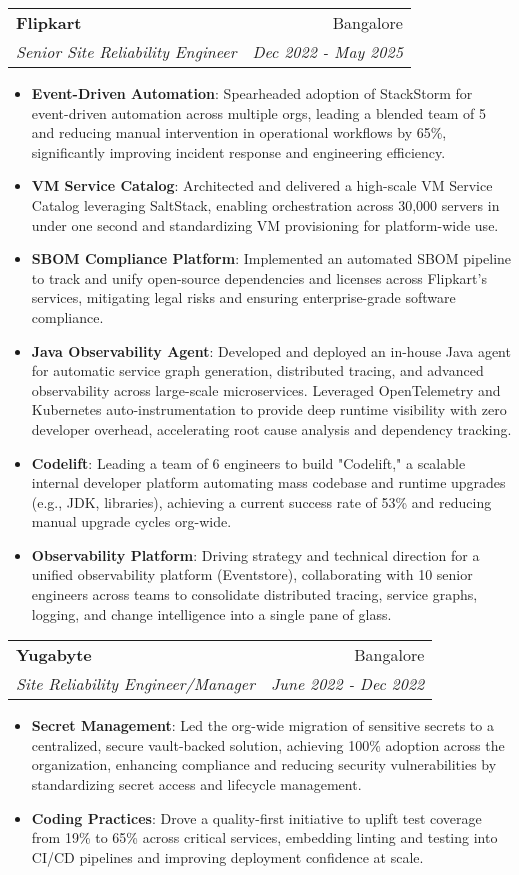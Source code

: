 \documentclass[letterpaper,11pt]{article}
\makeatletter
\newcommand{\resumeItem}[2]{
  \item\small{
    \textbf{#1}{: #2 \vspace{-2pt}}
  }
}
\newcommand{\resumeSubheading}[4]{
  \vspace{-1pt}\item
    \begin{tabular*}{0.97\textwidth}{l@{\extracolsep{\fill}}r}
      \textbf{#1} & #2 \\
      \textit{\small#3} & \textit{\small #4} \\
    \end{tabular*}\vspace{-5pt}
}
\newcommand{\resumeItemListStart}{\begin{itemize}}
\newcommand{\resumeItemListEnd}{\end{itemize}\vspace{-5pt}}
\makeatother
\begin{document}
    \resumeSubheading
      {Flipkart}{Bangalore}
      {Senior Site Reliability Engineer}{Dec 2022 - May 2025}
      \resumeItemListStart
        \resumeItem{Event-Driven Automation}
          {Spearheaded adoption of StackStorm for event-driven automation across multiple orgs, leading a blended team of 5 and reducing manual intervention in operational workflows by 65\%, significantly improving incident response and engineering efficiency.}
        \resumeItem{VM Service Catalog}
          {Architected and delivered a high-scale VM Service Catalog leveraging SaltStack, enabling orchestration across 30,000 servers in under one second and standardizing VM provisioning for platform-wide use.}
        \resumeItem{SBOM Compliance Platform}
          {Implemented an automated SBOM pipeline to track and unify open-source dependencies and licenses across Flipkart’s services, mitigating legal risks and ensuring enterprise-grade software compliance.}
        \resumeItem{Java Observability Agent}
          {Developed and deployed an in-house Java agent for automatic service graph generation, distributed tracing, and advanced observability across large-scale microservices. Leveraged OpenTelemetry and Kubernetes auto-instrumentation to provide deep runtime visibility with zero developer overhead, accelerating root cause analysis and dependency tracking.}
        \resumeItem{Codelift}
          {Leading a team of 6 engineers to build "Codelift," a scalable internal developer platform automating mass codebase and runtime upgrades (e.g., JDK, libraries), achieving a current success rate of 53\% and reducing manual upgrade cycles org-wide.}
        \resumeItem{Observability Platform}
          {Driving strategy and technical direction for a unified observability platform (Eventstore), collaborating with 10 senior engineers across teams to consolidate distributed tracing, service graphs, logging, and change intelligence into a single pane of glass.}
      \resumeItemListEnd

    \resumeSubheading
      {Yugabyte}{Bangalore}
      {Site Reliability Engineer/Manager}{June 2022 - Dec 2022}
      \resumeItemListStart
        \resumeItem{Secret Management}
          {Led the org-wide migration of sensitive secrets to a centralized, secure vault-backed solution, achieving 100\% adoption across the organization, enhancing compliance and reducing security vulnerabilities by standardizing secret access and lifecycle management.}
        \resumeItem{Coding Practices}
          {Drove a quality-first initiative to uplift test coverage from 19\% to 65\% across critical services, embedding linting and testing into CI/CD pipelines and improving deployment confidence at scale.}
      \resumeItemListEnd
\end{document}
